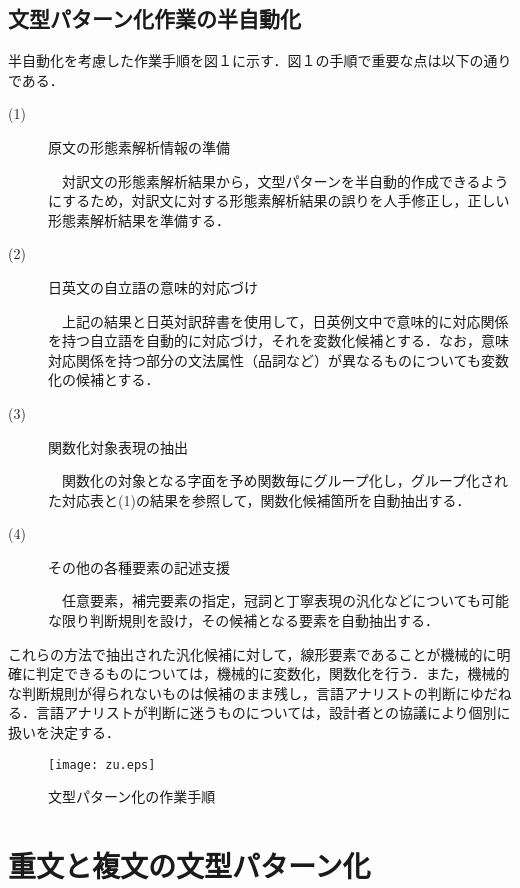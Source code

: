 \documentclass{nlp}
\begin{document}
\subsection{文型パターン化作業の半自動化}

半自動化を考慮した作業手順を図１に示す．図１の手順で重要な点は以下の通りである．
\begin{description}
\item[(1)]原文の形態素解析情報の準備

　対訳文の形態素解析結果から，文型パターンを半自動的作成できるようにするため，対訳文に対する形態素解析結果の誤りを人手修正し，正しい形態素解析結果を準備する．

\item[(2)]日英文の自立語の意味的対応づけ

　上記の結果と日英対訳辞書を使用して，日英例文中で意味的に対応関係を持つ自立語を自動的に対応づけ，それを変数化候補とする．なお，意味対応関係を持つ部分の文法属性（品詞など）が異なるものについても変数化の候補とする．

\item[(3)]関数化対象表現の抽出

　関数化の対象となる字面を予め関数毎にグループ化し，グループ化された対応表と(1)の結果を参照して，関数化候補箇所を自動抽出する．

\item[(4)]その他の各種要素の記述支援

　任意要素，補完要素の指定，冠詞と丁寧表現の汎化などについても可能な限り判断規則を設け，その候補となる要素を自動抽出する．

\end{description}

これらの方法で抽出された汎化候補に対して，線形要素であることが機械的に明確に判定できるものについては，機械的に変数化，関数化を行う．また，機械的な判断規則が得られないものは候補のまま残し，言語アナリストの判断にゆだねる．言語アナリストが判断に迷うものについては，設計者との協議により個別に扱いを決定する．


\begin{figure}[!htbp]
\begin{center}
\texttt{[image: zu.eps]}
\caption{文型パターン化の作業手順}
\label{fig:tejun}
\end{center}
\end{figure}

\section{重文と複文の文型パターン化}
\end{document}
